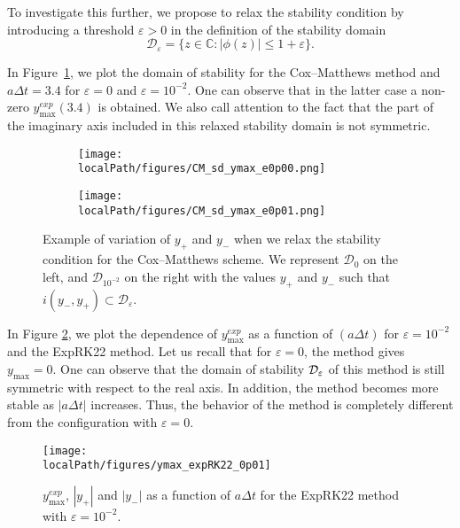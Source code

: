 To investigate this further, we propose to relax the stability condition by introducing a threshold $\varepsilon>0$ 
in the definition of the stability domain
\begin{equation}
\label{d_eps}
	\mathcal{D}_\varepsilon = \{ z\in\mathbb{C} : |\phi(z)| \leq 1+\varepsilon \}. 
\end{equation}

In Figure~\ref{ymax_example}, we plot the domain of stability for the Cox--Matthews method and $a\Delta t = 3.4$ for $\varepsilon=0$ and $\varepsilon=10^{-2}$. One can observe that in the latter case a non-zero $y_{\max}^{exp}(3.4)$ is obtained. We also call attention to the fact that the part of the imaginary axis included in this relaxed stability domain is not symmetric. 

\begin{figure}[h]
  \centering
  \begin{subfigure}[b]{0.33\textwidth}
        \centering \texttt{[image: \\localPath/figures/CM\_sd\_ymax\_e0p00.png]}
  \end{subfigure}
  \begin{subfigure}[b]{0.33\textwidth}
        \centering \texttt{[image: \\localPath/figures/CM\_sd\_ymax\_e0p01.png]}
  \end{subfigure}
  \caption{Example of variation of $y_+$ and $y_-$ when we relax the stability condition for the Cox--Matthews scheme. We represent $\mathcal{D}_{0}$ on the left, and $\mathcal{D}_{10^{-2}}$ on the right with the values $y_+$ and $y_-$  such that 
  $i(y_-, y_+)\subset \mathcal{D}_{\varepsilon}$.}
  \label{ymax_example}
\end{figure}

In Figure \ref{ymax_expRK22}, we plot the dependence of $y^{exp}_{\max}$ as a function of $(a\Delta t)$ for $\varepsilon=10^{-2}$ and the ExpRK22 method. Let us recall that for $\varepsilon=0$, the method gives $y_{\max}=0$. One can observe that the  domain of stability 
${\cal D}_\varepsilon$  of this method is still symmetric with respect to the real axis. In addition, the method becomes more stable as $|a\Delta t|$ increases. Thus, the behavior of the method is completely different from the configuration with $\varepsilon=0$.

\begin{figure}[h]
	\centering
	\texttt{[image: \\localPath/figures/ymax\_expRK22\_0p01]}
    \caption{$y^{exp}_{\max}$, $|y_+|$ and $|y_-|$ as a function of $a \Delta t$ for the ExpRK22 method with $\varepsilon=10^{-2}$. } 
	\label{ymax_expRK22}
\end{figure}

